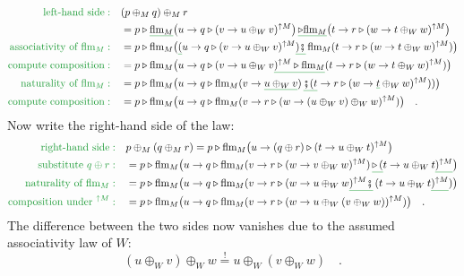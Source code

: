 \begin{align*}
{\color{greenunder}\text{left-hand side}:}\quad & (p\oplus_{M}q)\oplus_{M}r\\
 & =p\triangleright\gunderline{\text{flm}_{M}}\big(u\rightarrow q\triangleright(v\rightarrow u\oplus_{W}v)^{\uparrow M}\big)\,\gunderline{\triangleright\text{flm}_{M}}\big(t\rightarrow r\triangleright(w\rightarrow t\oplus_{W}w)^{\uparrow M}\big)\\
{\color{greenunder}\text{associativity of }\text{flm}_{M}:}\quad & =p\triangleright\text{flm}_{M}\big(\gunderline (u\rightarrow q\triangleright(v\rightarrow u\oplus_{W}v)^{\uparrow M}\gunderline{)\bef}\,\text{flm}_{M}(t\rightarrow r\triangleright(w\rightarrow t\oplus_{W}w)^{\uparrow M})\big)\\
{\color{greenunder}\text{compute composition}:}\quad & =p\triangleright\text{flm}_{M}\big(u\rightarrow q\triangleright(v\rightarrow u\oplus_{W}v\gunderline{)^{\uparrow M}\triangleright\text{flm}_{M}}(t\rightarrow r\triangleright(w\rightarrow t\oplus_{W}w)^{\uparrow M})\big)\\
{\color{greenunder}\text{naturality of }\text{flm}_{M}:}\quad & =p\triangleright\text{flm}_{M}\big(u\rightarrow q\triangleright\text{flm}_{M}(v\rightarrow\gunderline{u\oplus_{W}v})\,\gunderline{\bef(t}\rightarrow r\triangleright(w\rightarrow\gunderline t\oplus_{W}w)^{\uparrow M}))\big)\\
{\color{greenunder}\text{compute composition}:}\quad & =p\triangleright\text{flm}_{M}\big(u\rightarrow q\triangleright\text{flm}_{M}(v\rightarrow r\triangleright(w\rightarrow(u\oplus_{W}v)\oplus_{W}w)^{\uparrow M})\big)\quad.
\end{align*}
Now write the right-hand side of the law:
\begin{align*}
{\color{greenunder}\text{right-hand side}:}\quad & p\oplus_{M}(q\oplus_{M}r)=p\triangleright\text{flm}_{M}\big(u\rightarrow(q\oplus r)\triangleright(t\rightarrow u\oplus_{W}t)^{\uparrow M}\big)\\
{\color{greenunder}\text{substitute }q\oplus r:}\quad & =p\triangleright\text{flm}_{M}\big(u\rightarrow q\triangleright\text{flm}_{M}(v\rightarrow r\triangleright(w\rightarrow v\oplus_{W}w)^{\uparrow M})\,\gunderline{\triangleright\,(}t\rightarrow u\oplus_{W}t\gunderline{)^{\uparrow M}}\big)\\
{\color{greenunder}\text{naturality of }\text{flm}_{M}:}\quad & =p\triangleright\text{flm}_{M}\big(u\rightarrow q\triangleright\text{flm}_{M}(v\rightarrow r\triangleright(w\rightarrow u\oplus_{W}w\gunderline{)^{\uparrow M}\bef}\,(t\rightarrow u\oplus_{W}t\gunderline{)^{\uparrow M}})\big)\\
{\color{greenunder}\text{composition under }^{\uparrow M}:}\quad & =p\triangleright\text{flm}_{M}\big(u\rightarrow q\triangleright\text{flm}_{M}(v\rightarrow r\triangleright(w\rightarrow u\oplus_{W}(v\oplus_{W}w))^{\uparrow M})\big)\quad.
\end{align*}
 The difference between the two sides now vanishes due to the assumed
associativity law of $W$:
\[
(u\oplus_{W}v)\oplus_{W}w\overset{!}{=}u\oplus_{W}(v\oplus_{W}w)\quad.
\]


